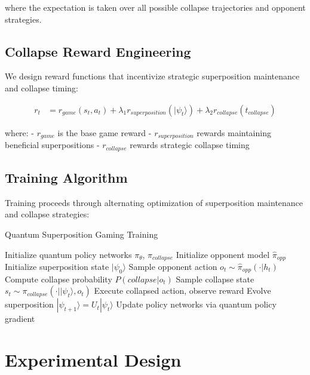 \documentclass[11pt,a4paper]{article}
\begin{document}
where the expectation is taken over all possible collapse trajectories and opponent strategies.

\subsection{Collapse Reward Engineering}

We design reward functions that incentivize strategic superposition maintenance and collapse timing:

\begin{align}
r_t &= r_{game}(s_t, a_t) + \lambda_1 r_{superposition}(|\psi_t\rangle) + \lambda_2 r_{collapse}(t_{collapse})
\end{align}

where:
- $r_{game}$ is the base game reward
- $r_{superposition}$ rewards maintaining beneficial superpositions
- $r_{collapse}$ rewards strategic collapse timing

\subsection{Training Algorithm}

Training proceeds through alternating optimization of superposition maintenance and collapse strategies:

\begin{algorithm}
\caption{Quantum Superposition Gaming Training}
\begin{algorithmic}[1]
\STATE Initialize quantum policy networks $\pi_\theta$, $\pi_{collapse}$
\STATE Initialize opponent model $\hat{\pi}_{opp}$
    \STATE Initialize superposition state $|\psi_0\rangle$
        \STATE Sample opponent action $o_t \sim \hat{\pi}_{opp}(\cdot|h_t)$
        \STATE Compute collapse probability $P(collapse|o_t)$
            \STATE Sample collapse state $s_t \sim \pi_{collapse}(\cdot||\psi_t\rangle, o_t)$
            \STATE Execute collapsed action, observe reward
        \ELSE
            \STATE Evolve superposition $|\psi_{t+1}\rangle = U_t|\psi_t\rangle$
        \ENDIF
        \STATE Update policy networks via quantum policy gradient
    \ENDFOR
\ENDFOR
\end{algorithmic}
\end{algorithm}

\section{Experimental Design}
\end{document}
